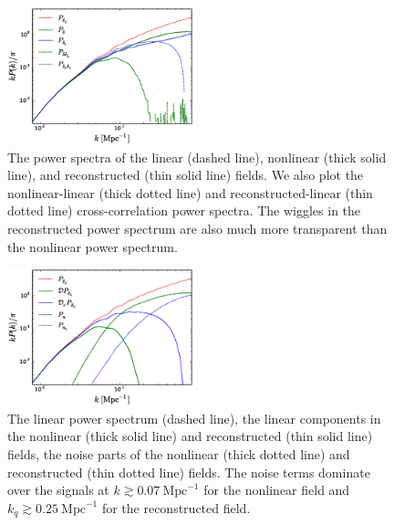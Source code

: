 \documentclass[aps,prd,twocolumn,showpacs,superscriptaddress,groupedaddress,nofootinbib]{revtex4}  %
\newcommand{\mr}{\mathrm}
\begin{document}
\begin{figure}[tbp]
\begin{center}
\includegraphics[width=0.48\textwidth]{f3x.eps}
\end{center}
\vspace{-0.7cm}
\caption{The power spectra of the linear (dashed line), nonlinear (thick solid
line), and reconstructed (thin solid line) fields. 
We also plot the nonlinear-linear (thick dotted line) and 
reconstructed-linear (thin dotted line) cross-correlation power spectra.
The wiggles in the reconstructed power spectrum are also much 
more transparent than the nonlinear power spectrum.}
\label{fig:ps}
\end{figure}

\begin{figure}[tbp]
\begin{center}
\includegraphics[width=0.48\textwidth]{f3xx.eps}
\end{center}
\vspace{-0.7cm}
\caption{The linear power spectrum (dashed line), the linear components in the
nonlinear (thick solid line) and reconstructed (thin solid line) fields,
the noise parts of the nonlinear (thick dotted line) and reconstructed (thin
dotted line) fields. The noise terms dominate over the signals at 
$k\gtrsim0.07\ \mr{Mpc}^{-1}$ for the nonlinear field and $k_q\gtrsim0.25\ \mr{Mpc}^{-1}$
for the reconstructed field.}
\label{fig:pn}
\end{figure}
\end{document}
